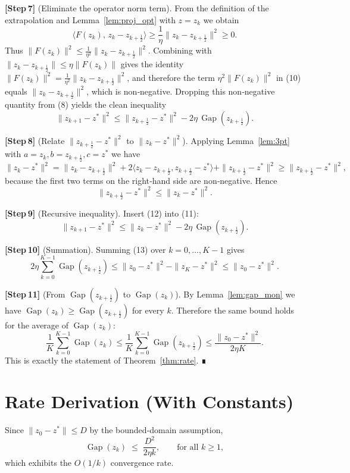 \documentclass{article}
\newcommand{\gap}{\operatorname{Gap}}
\begin{document}
\bigskip
\noindent\textbf{[Step 7]} (Eliminate the operator norm term).  
From the definition of the extrapolation and Lemma~\ref{lem:proj_opt} with $z=z_{k}$ we obtain
\[
\langle F(z_{k}),\,z_{k}-z_{k+\frac12}\rangle\ge\frac{1}{\eta}\|z_{k}-z_{k+\frac12}\|^{2}
\ge0 .
\]
Thus $\|F(z_{k})\|^{2}\le\frac{1}{\eta^{2}}\|z_{k}-z_{k+\frac12}\|^{2}$.
Combining with $\|z_{k}-z_{k+\frac12}\|\le\eta\|F(z_{k})\|$ gives the identity
$\|F(z_{k})\|^{2}=\frac{1}{\eta^{2}}\|z_{k}-z_{k+\frac12}\|^{2}$, and therefore the term
$\eta^{2}\|F(z_{k})\|^{2}$ in (10) equals $\|z_{k}-z_{k+\frac12}\|^{2}$, which is non‑negative.
Dropping this non‑negative quantity from (8) yields the clean inequality
\begin{equation}
\|z_{k+1}-z^{*}\|^{2}
\le\|z_{k+\frac12}-z^{*}\|^{2}
-2\eta\,\gap(z_{k+\frac12}).
\tag{11}
\end{equation}

\bigskip
\noindent\textbf{[Step 8]} (Relate $\|z_{k+\frac12}-z^{*}\|^{2}$ to $\|z_{k}-z^{*}\|^{2}$).  
Applying Lemma~\ref{lem:3pt} with $a=z_{k},b=z_{k+\frac12},c=z^{*}$ we have
\[
\|z_{k}-z^{*}\|^{2}
=\|z_{k}-z_{k+\frac12}\|^{2}+2\langle z_{k}-z_{k+\frac12},z_{k+\frac12}-z^{*}\rangle
+\|z_{k+\frac12}-z^{*}\|^{2}
\ge\|z_{k+\frac12}-z^{*}\|^{2},
\]
because the first two terms on the right‑hand side are non‑negative.
Hence
\[
\|z_{k+\frac12}-z^{*}\|^{2}\le\|z_{k}-z^{*}\|^{2}.
\tag{12}
\]

\bigskip
\noindent\textbf{[Step 9]} (Recursive inequality).  
Insert (12) into (11):
\[
\|z_{k+1}-z^{*}\|^{2}
\le\|z_{k}-z^{*}\|^{2}
-2\eta\,\gap(z_{k+\frac12}).
\tag{13}
\]

\bigskip
\noindent\textbf{[Step 10]} (Summation).  
Summing (13) over $k=0,\dots,K-1$ gives
\[
2\eta\sum_{k=0}^{K-1}\gap(z_{k+\frac12})
\le\|z_{0}-z^{*}\|^{2}-\|z_{K}-z^{*}\|^{2}
\le\|z_{0}-z^{*}\|^{2}.
\tag{14}
\]

\bigskip
\noindent\textbf{[Step 11]} (From $\gap(z_{k+\frac12})$ to $\gap(z_{k})$).  
By Lemma~\ref{lem:gap_mon} we have $\gap(z_{k})\ge\gap(z_{k+\frac12})$ for every $k$.
Therefore the same bound holds for the average of $\gap(z_{k})$:
\[
\frac{1}{K}\sum_{k=0}^{K-1}\gap(z_{k})
\le\frac{1}{K}\sum_{k=0}^{K-1}\gap(z_{k+\frac12})
\le\frac{\|z_{0}-z^{*}\|^{2}}{2\eta K}.
\tag{15}
\]
This is exactly the statement of Theorem~\ref{thm:rate}.  ∎

\section*{Rate Derivation (With Constants)}
Since $\|z_{0}-z^{*}\|\le D$ by the bounded‑domain assumption,
\[
\gap(z_{k})\;\le\;\frac{D^{2}}{2\eta k},
\qquad\text{for all }k\ge1,
\]
which exhibits the $O(1/k)$ convergence rate.
\end{document}
